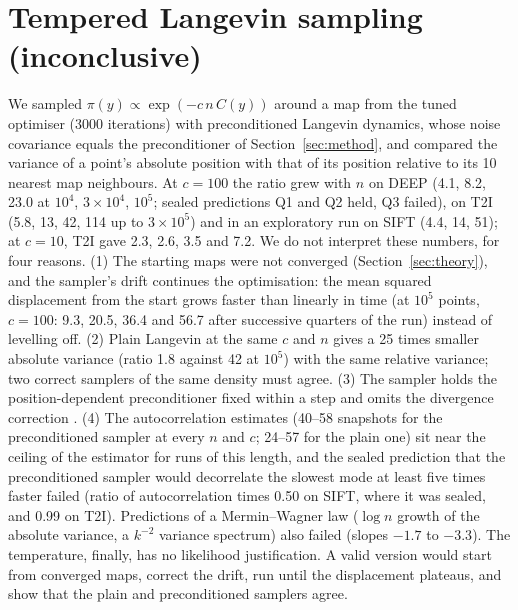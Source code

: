 \documentclass[11pt]{article}
\begin{document}
\section{Tempered Langevin sampling (inconclusive)}\label{app:langevin}
We sampled $\pi(y)\propto\exp(-c\,n\,C(y))$ around a map from the tuned optimiser (3000 iterations) with
preconditioned Langevin dynamics, whose noise covariance equals the preconditioner of Section~\ref{sec:method}, and
compared the variance of a point's absolute position with that of its position relative to its 10 nearest map
neighbours. At $c=100$ the ratio grew with $n$ on DEEP (4.1, 8.2, 23.0 at $10^4$, $3\times10^4$, $10^5$; sealed
predictions Q1 and Q2 held, Q3 failed), on T2I (5.8, 13, 42, 114 up to $3\times10^5$) and in an exploratory run on
SIFT (4.4, 14, 51); at $c=10$, T2I gave 2.3, 2.6, 3.5 and 7.2. We do not interpret these numbers, for four reasons.
(1) The starting maps were not converged (Section~\ref{sec:theory}), and the sampler's drift continues the
optimisation: the mean squared displacement from the start grows faster than linearly in time (at $10^5$ points,
$c=100$: 9.3, 20.5, 36.4 and 56.7 after successive quarters of the run) instead of levelling off. (2) Plain Langevin
at the same $c$ and $n$ gives a 25 times smaller absolute variance (ratio 1.8 against 42 at $10^5$) with the same
relative variance; two correct samplers of the same density must agree. (3) The sampler holds the position-dependent
preconditioner fixed within a step and omits the divergence correction \citep{girolami2011,xifara2014}. (4) The
autocorrelation estimates (40--58 snapshots for the preconditioned sampler at every $n$ and $c$; 24--57 for the plain
one) sit near the ceiling of the estimator for runs of this length, and the sealed prediction that the preconditioned
sampler would decorrelate the slowest mode at least five times faster failed (ratio of autocorrelation times 0.50 on
SIFT, where it was sealed, and 0.99 on T2I). Predictions of a Mermin--Wagner law \citep{mermin1966} ($\log n$ growth
of the absolute variance, a $k^{-2}$ variance spectrum) also failed (slopes $-1.7$ to $-3.3$). The temperature, finally,
has no likelihood justification. A valid version would start from converged maps, correct the drift, run until the
displacement plateaus, and show that the plain and preconditioned samplers agree.
\end{document}
